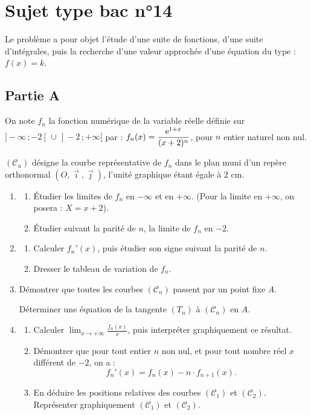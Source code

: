 \section*{Sujet type bac n°14}

Le problème a pour objet l'étude d'une suite de fonctions, d'une suite d'intégrales, puis la recherche d'une valeur approchée d'une équation du type : $f(x)=k$.

\subsection*{Partie A}

On note $f_n$ la fonction numérique de la variable réelle définie sur $]-\infty\,;-2[\,\cup\,]-2\,;+\infty[$ par : $f_n(x)=\dfrac{\mathrm{e}^{1+x}}{(x+2)^n}$, pour $n$ entier naturel non nul.

$(\mathscr{C}_n)$ désigne la courbe représentative de $f_n$ dans le plan muni d'un repère orthonormal $(O,\vec{\imath},\vec{\jmath})$, l'unité graphique étant égale à $2$ cm.

\begin{enumerate}
	\item
	\begin{enumerate}
		\item Étudier les limites de $f_n$ en $-\infty$ et en $+\infty$. (Pour la limite en $+\infty$, on posera : $X=x+2$).
		\item Étudier suivant la parité de $n$, la limite de $f_n$ en $-2$.
	\end{enumerate}
	\item
	\begin{enumerate}
		\item Calculer $f_n'(x)$, puis étudier son signe suivant la parité de $n$.
		\item Dresser le tableau de variation de $f_n$.
	\end{enumerate}
	\item Démontrer que toutes les courbes $(\mathscr{C}_n)$ passent par un point fixe $A$.

	Déterminer une équation de la tangente $(T_n)$ à $(\mathscr{C}_n)$ en $A$.
	\item
	\begin{enumerate}
		\item Calculer $\displaystyle\lim_{x\to+\infty} \frac{f_n(x)}{x}$, puis interpréter graphiquement ce résultat.
		\item Démontrer que pour tout entier $n$ non nul, et pour tout nombre réel $x$ différent de $-2$, on a :
		\[
		f_n'(x) = f_n(x) - n\cdot f_{n+1}(x).
		\]
		\item En déduire les positions relatives des courbes $(\mathscr{C}_1)$ et $(\mathscr{C}_2)$. Représenter graphiquement $(\mathscr{C}_1)$ et $(\mathscr{C}_2)$.
	\end{enumerate}
\end{enumerate}

